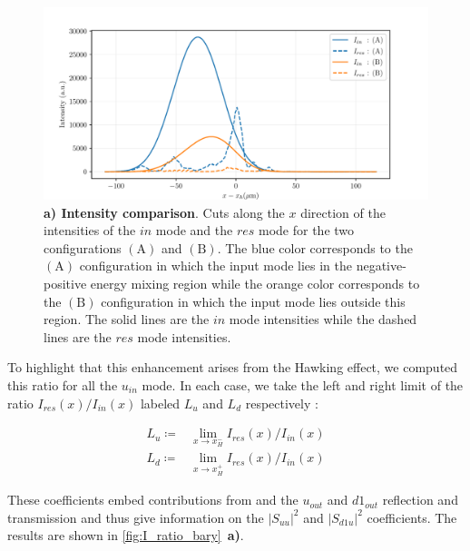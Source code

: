 \begin{figure}
    \centering
    \includegraphics[width=1\textwidth]{chap_stimulated_hawking/fig/intensity_comparison.pdf}
    \caption{\textbf{a) Intensity comparison}. Cuts along the $x$ direction of the intensities of the $in$ mode and the $res$ mode for the two configurations $\mathrm{(A)}$ and $\mathrm{(B)}$.
    The blue color corresponds to the $\mathrm{(A)}$ configuration in which the input mode lies in the negative-positive energy mixing region while the orange color corresponds to the $\mathrm{(B)}$ configuration in which the input mode lies outside this region.
    The solid lines are the $in$ mode intensities while the dashed lines are the $res$ mode intensities.}
    \label{fig:intensity_comparison}
\end{figure}

To highlight that this enhancement arises from the Hawking effect, we computed this ratio for all the $u_{in}$ mode. In each case, we take the left and right limit of the ratio $I_{res}(x)/I_{in}(x)$  labeled $L_u$ and $L_d$ respectively :
 
\begin{equation}
    \begin{aligned}
        L_u \coloneqq &\lim_{x\to x_H^-}I_{res}(x)/I_{in}(x) \\
        L_d \coloneqq &\lim_{x\to x_H^+}I_{res}(x)/I_{in}(x)
    \end{aligned}
\end{equation}
    
These coefficients embed contributions from and the $u_{out}$ and $d1_{out}$ reflection and transmission and thus give information on the $|S_{uu}|^2$ and $|S_{d1u}|^2$ coefficients.
The results are shown in \autoref{fig:I_ratio_bary}~\textbf{a)}. 

